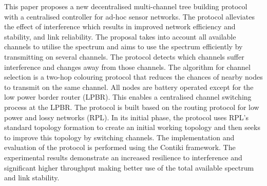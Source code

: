 This paper proposes a new decentralised multi-channel tree building protocol with a centralised controller for ad-hoc sensor networks. The protocol alleviates the effect of interference which results in improved network efficiency and stability, and link reliability. 
        The proposal takes into account all available channels to utilise the spectrum and aims to use the spectrum efficiently by transmitting on several channels. The protocol detects which channels suffer interference and changes away from those channels. The algorithm for channel selection is a two-hop colouring protocol that reduces the chances of nearby nodes to transmit on the same channel. 
        All nodes are battery operated except for the low power border router (LPBR). This enables a centralised channel switching process at the LPBR. The protocol is built based on the routing protocol for low power and lossy networks (RPL). In its initial phase, the protocol uses RPL's standard topology formation to create an initial working topology and then seeks to improve this topology by switching channels.
        The implementation and evaluation of the protocol is performed using the Contiki framework.
The experimental results demonstrate an increased resilience to interference and significant higher throughput making better use of the total available spectrum and link stability.